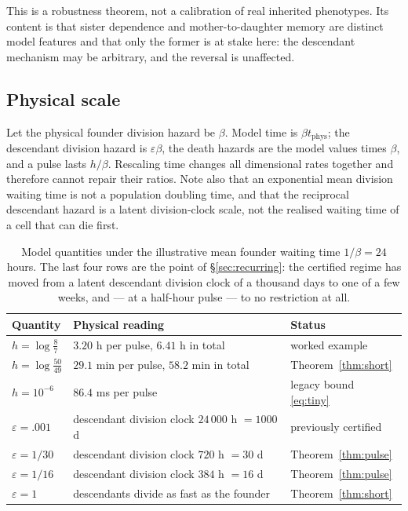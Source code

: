 \documentclass[11pt]{article}
\theoremstyle{plain}
\theoremstyle{definition}
\theoremstyle{remark}
\newcommand{\eps}{\varepsilon}
\begin{document}
This is a robustness theorem, not a calibration of real inherited phenotypes.
Its content is that sister dependence and mother-to-daughter memory are
distinct model features and that only the former is at stake here: the
descendant mechanism may be arbitrary, and the reversal is unaffected.

\subsection{Physical scale}\label{sec:scale}

Let the physical founder division hazard be $\beta$. Model time is
$\beta t_{\mathrm{phys}}$; the descendant division hazard is $\eps\beta$, the
death hazards are the model values times $\beta$, and a pulse lasts $h/\beta$.
Rescaling time changes all dimensional rates together and therefore cannot
repair their ratios. Note also that an exponential mean division waiting time
is not a population doubling time, and that the reciprocal descendant hazard is
a latent division-clock scale, not the realised waiting time of a cell that can
die first.

\begin{table}[tb]
\centering\small
\caption{Model quantities under the illustrative mean founder waiting time
$1/\beta=24$ hours. The last four rows are the point of \S\ref{sec:recurring}:
the certified regime has moved from a latent descendant division clock of a
thousand days to one of a few weeks, and --- at a half-hour pulse --- to no
restriction at all.}
\label{tab:scale}
\begin{tabularx}{\linewidth}{@{}llX@{}}
\toprule
Quantity & Physical reading & Status\\\midrule
$h=\log\frac87$ & $3.20$ h per pulse, $6.41$ h in total & worked example\\
$h=\log\frac{50}{49}$ & $29.1$ min per pulse, $58.2$ min in total & Theorem~\ref{thm:short}\\
$h=10^{-6}$ & $86.4$ ms per pulse & legacy bound \eqref{eq:tiny}\\
$\eps=.001$ & descendant division clock $24\,000$ h $=1000$ d & previously certified\\
$\eps=1/30$ & descendant division clock $720$ h $=30$ d & Theorem~\ref{thm:pulse}\\
$\eps=1/16$ & descendant division clock $384$ h $=16$ d & Theorem~\ref{thm:pulse}\\
$\eps=1$ & descendants divide as fast as the founder & Theorem~\ref{thm:short}\\
\bottomrule
\end{tabularx}
\end{table}
\end{document}
